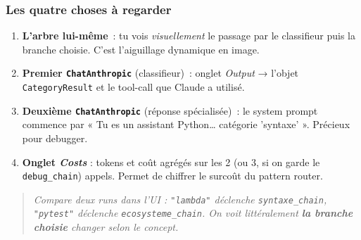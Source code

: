 \documentclass[11pt,a4paper]{article}
\begin{document}
\begin{center}
\end{center}

\subsubsection*{Les quatre choses à regarder}

\begin{enumerate}[leftmargin=*]
  \item \textbf{L'arbre lui-même}~: tu vois \emph{visuellement} le passage
        par le classifieur puis la branche choisie. C'est l'aiguillage
        dynamique en image.
  \item \textbf{Premier \texttt{ChatAnthropic}} (classifieur)~: onglet
        \emph{Output} → l'objet \texttt{CategoryResult} et le tool-call
        que Claude a utilisé.
  \item \textbf{Deuxième \texttt{ChatAnthropic}} (réponse spécialisée)~:
        le system prompt commence par « Tu es un assistant Python\dots
        catégorie 'syntaxe' ». Précieux pour debugger.
  \item \textbf{Onglet \emph{Costs}} : tokens et coût agrégés sur les 2
        (ou 3, si on garde le \texttt{debug\_chain}) appels. Permet de
        chiffrer le surcoût du pattern router.
\end{enumerate}

\begin{quote}\itshape
Compare deux runs dans l'UI : \texttt{"lambda"} déclenche
\texttt{syntaxe\_chain}, \texttt{"pytest"} déclenche
\texttt{ecosysteme\_chain}. On voit littéralement \textbf{la branche
choisie} changer selon le concept.
\end{quote}
\end{document}
